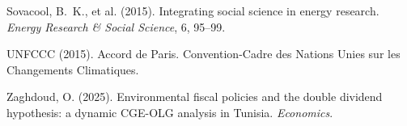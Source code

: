 \documentclass[12pt, a4paper]{article}
\begin{document}
\begin{enumerate}[label={[\arabic*]}, leftmargin=*]
\item Sovacool, B.~K., et al. (2015). Integrating social science in energy research. \textit{Energy Research \& Social Science}, 6, 95--99.

\item UNFCCC (2015). Accord de Paris. Convention-Cadre des Nations Unies sur les Changements Climatiques.

\item Zaghdoud, O. (2025). Environmental fiscal policies and the double dividend hypothesis: a dynamic CGE-OLG analysis in Tunisia. \textit{Economics}.

\end{enumerate}
\end{document}
